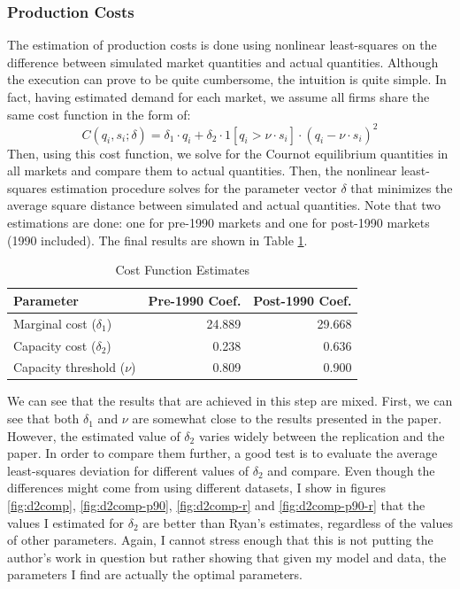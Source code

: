\documentclass[12pt]{article}
\begin{document}
\subsubsection{Production Costs}

The estimation of production costs is done using nonlinear least-squares on the difference between simulated market quantities and actual quantities. Although the execution can prove to be quite cumbersome, the intuition is quite simple. In fact, having estimated demand for each market, we assume all firms share the same cost function in the form of: $$C(q_i, s_i; \delta) = \delta_1 \cdot q_i + \delta_2 \cdot 1[q_i > \nu\cdot s_i] \cdot (q_i - \nu\cdot s_i)^2 $$
Then, using this cost function, we solve for the Cournot equilibrium quantities in all markets and compare them to actual quantities. Then, the nonlinear least-squares estimation procedure solves for the parameter vector $\delta$ that minimizes the average square distance between simulated and actual quantities. Note that two estimations are done: one for pre-1990 markets and one for post-1990 markets (1990 included). The final results are shown in Table \ref{tab:prodcosts}.

\begin{table}[ht!]
\centering
\begin{tabular}{lrr}
\hline \hline
Parameter & Pre-1990 Coef. & Post-1990 Coef. \\ \hline
Marginal cost ($\delta_1$) & 24.889 & 29.668 \\
Capacity cost ($\delta_2$) & 0.238 & 0.636 \\
Capacity threshold ($\nu$) & 0.809 & 0.900 \\ \hline \hline
\end{tabular}
\caption{Cost Function Estimates}
\label{tab:prodcosts}
\end{table}

We can see that the results that are achieved in this step are mixed. First, we can see that both $\delta_1$ and $\nu$ are somewhat close to the results presented in the paper. However, the estimated value of $\delta_2$ varies widely between the replication and the paper. In order to compare them further, a good test is to evaluate the average least-squares deviation for different values of $\delta_2$ and compare. Even though the differences might come from using different datasets, I show in figures \ref{fig:d2comp}, \ref{fig:d2comp-p90}, \ref{fig:d2comp-r} and \ref{fig:d2comp-p90-r} that the values I estimated for $\delta_2$ are better than Ryan's estimates, regardless of the values of other parameters. Again, I cannot stress enough that this is not putting the author's work in question but rather showing that given my model and data, the parameters I find are actually the optimal parameters.
\end{document}
